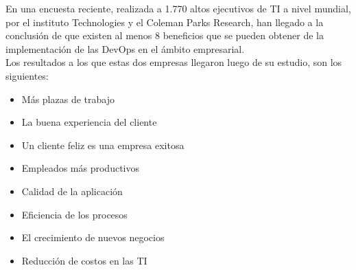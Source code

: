 \documentclass[preprint,12pt]{elsarticle}
\begin{document}
En una encuesta reciente, realizada a 1.770 altos ejecutivos de TI a nivel mundial, por el instituto Technologies y el Coleman Parks Research, han llegado a la conclusión de que existen al menos 8 beneficios que se pueden obtener de la implementación de las DevOps en el ámbito empresarial. 
\\Los resultados a los que estas dos empresas llegaron luego de su estudio, son los siguientes: \cite{TicNews2017}   
\begin{itemize}

\item Más plazas de trabajo

\item La buena experiencia del cliente

\item Un cliente feliz es una empresa exitosa

\item Empleados más productivos

\item Calidad de la aplicación

\item Eficiencia de los procesos

\item El crecimiento de nuevos negocios

\item Reducción de costos en las TI

\end{itemize}
\end{document}
